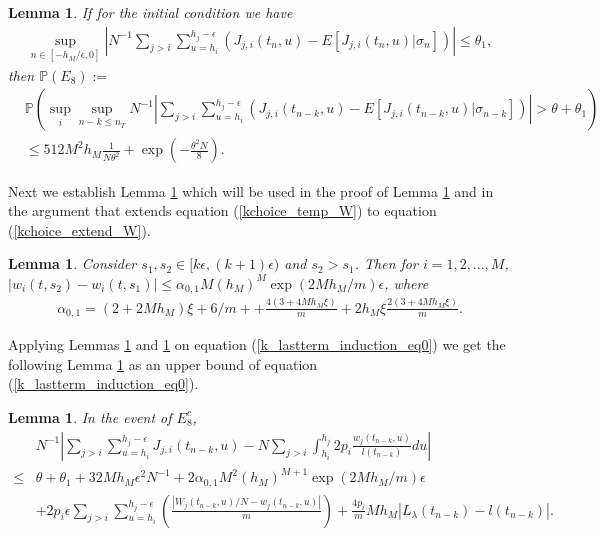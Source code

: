 \documentclass[12pt]{article}
\def\P{\mathbb{P}}
\numberwithin{equation}{section}  %
\newtheorem{lem}[thm]{Lemma}
\begin{document}
\begin{lem}\label{k_dJ1}%
If for the initial condition we have 
\begin{align}
\sup_{n\in[-h_M/\epsilon,0]}\left|N^{-1}\sum_{j>i}\sum_{u=h_i}^{h_j-\epsilon}
 \left(
 J_{j,i}(t_{n},u)-E[J_{j,i}(t_{n},u)|\sigma_{n}]
 \right)\right|
 \leq \theta_1\label{kchoice_ini_eq6},
\end{align}
then $\P(E_8):=$
\begin{align*} 
&\P(\sup_{i}\sup_{n-k\leq n_T}N^{-1}|\sum_{j>i}\sum_{u=h_i}^{h_j-\epsilon}
 \left(
 J_{j,i}(t_{n-k},u)-E[J_{j,i}(t_{n-k},u)|\sigma_{n-k}]
 \right)|>\theta+\theta_1)\\
&\leq 512 M^2 h_M\frac{1}{N\theta^2}+\exp\left(
-\frac{\theta^2N}{8}\right).
\end{align*} 
\end{lem}

Next we establish Lemma \ref{k_extendw} which will be used in the proof of Lemma \ref{k_tempthirteen} and in the argument that extends equation (\ref{kchoice_temp_W}) to equation (\ref{kchoice_extend_W}).
\begin{lem}\label{k_extendw}%
Consider $s_1,s_2\in[k\epsilon,(k+1)\epsilon)$ and $s_2>s_1$. Then for $i=1,2,...,M$, $\left|w_i(t,s_2)-w_i(t,s_1)\right|\leq \alpha_{0,1}M(h_M)^M\exp(2Mh_M/m)\epsilon$, where 
\begin{align*} 
\alpha_{0,1}=(2+2Mh_M)\xi+6/m+
+\frac{4(3+4M h_M \xi)}{m}
+2h_M\xi \frac{2(3+4 M h_M \xi)}{m}.
\end{align*} 
\end{lem}
Applying Lemmas \ref{k_dJ1} and \ref{k_extendw} on equation (\ref{k_lastterm_induction_eq0}) we get the following Lemma \ref{k_tempthirteen} as an upper bound of equation (\ref{k_lastterm_induction_eq0}).

\begin{lem}\label{k_tempthirteen}%
In the event of $E_8^c$,
\begin{align*} 
&  N^{-1}\left|
\sum_{j>i} \sum_{u=h_i}^{h_j-\epsilon}J_{j,i}(t_{n-k},u)-N
\sum_{j>i} \int_{h_i}^{h_j}2p_i\frac{w_j(t_{n-k},u)}{l(t_{n-k})}du
\right|\\
\leq&  \theta+\theta_1
+32Mh_M\epsilon^{2}N^{-1}+2\alpha_{0,1}M^2(h_M)^{M+1}\exp(2Mh_M/m)\epsilon\\
&+2p_i\epsilon  \sum_{j>i} \sum_{u=h_i}^{h_j-\epsilon} 
\left(
\frac{ |W_j(t_{n-k},u)/N- w_j(t_{n-k},u)|}{m}
\right)
+\frac{4p_i}{m}Mh_M|L_{\lambda}(t_{n-k})-l(t_{n-k})|.
\end{align*}
\end{lem}
\end{document}
